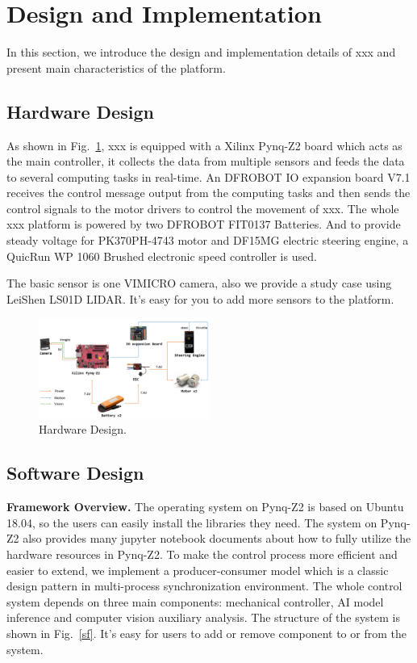\documentclass[conference]{IEEEtran}
\begin{document}
\begin{sloppypar}
\section{Design and Implementation}
In this section, we introduce the design and implementation details of xxx and present main characteristics of the platform.

\subsection{Hardware Design}
As shown in Fig.~\ref{hd}, xxx is equipped with a Xilinx Pynq-Z2 board which acts as the main controller, it collects the data from multiple sensors and feeds the data to several computing tasks in real-time. An DFROBOT IO expansion board V7.1 receives the control message output from the computing tasks and then sends the control signals to the motor drivers to control the movement of xxx. The whole xxx platform is powered by two DFROBOT FIT0137 Batteries. And to provide steady voltage for PK370PH-4743 motor and DF15MG electric steering engine, a QuicRun WP 1060 Brushed electronic speed controller is used.

The basic sensor is one VIMICRO camera, also we provide a study case using LeiShen LS01D LIDAR. It's easy for you to add more sensors to the platform.

\begin{figure}[htbp]
\centerline{\includegraphics[width=0.5\textwidth]{hd.PNG}}
\caption{Hardware Design.}
\label{hd}
\end{figure}

\subsection{Software Design}
\textbf{Framework Overview.} The operating system on Pynq-Z2 is based on Ubuntu 18.04, so the users can easily install the libraries they need. The system on Pynq-Z2 also provides many jupyter notebook documents about how to fully utilize the hardware resources in Pynq-Z2. To make the control process more efficient and easier to extend, we implement a producer-consumer model\cite{b18} which is a classic design pattern in multi-process synchronization environment. The whole control system depends on three main components: mechanical controller, AI model inference and computer vision auxiliary analysis. The structure of the system is shown in Fig.~\ref{sf}. It's easy for users to add or remove component to or from the system. 


\end{sloppypar}
\end{document}
